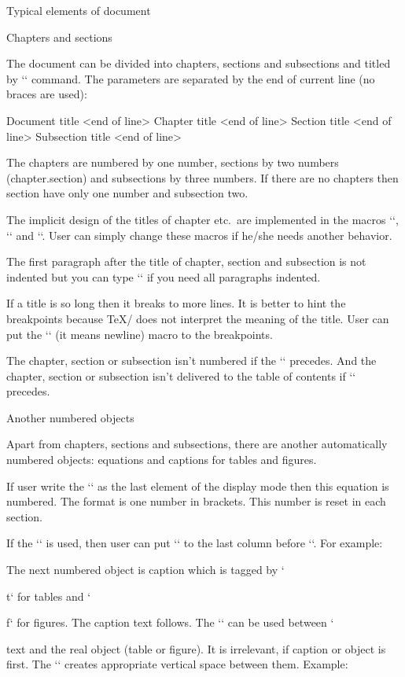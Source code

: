 \sec Typical elements of document

\secc[chap] Chapters and sections

The document can be divided into chapters, sections and subsections and titled
by `\tit` command. The parameters are separated by the end of current line (no
braces are used):

\begtt
\tit Document title <end of line>
\chap Chapter title <end of line>
\sec Section title <end of line>
\secc Subsection title <end of line>
\endtt

The chapters are numbered by one number, sections by two numbers
(chapter.section) and subsections by three numbers. If there are no chapters
then section have only one number and subsection two.

The implicit design of the titles of chapter etc.\ are implemented in the
macros `\printchap`, `\printsec` and `\printsecc`. User can simply change
these macros if he/she needs another behavior.

The first paragraph after the title of chapter, section and subsection is
not indented but you can type `\let\firstnoindent=\relax` if you need all
paragraphs indented.

If a title is so long then it breaks to more lines. It is better to hint the
breakpoints because \TeX/ does not interpret the meaning of the title.
User can put the `\nl` (it means newline) macro to the breakpoints.

The chapter, section or subsection isn't numbered if the `\nonum` precedes.
And the chapter, section or subsection isn't delivered to the table of
contents if `\notoc` precedes.

\secc[cap] Another numbered objects

Apart from chapters, sections and subsections, there are another
automatically numbered objects: equations and captions for tables and
figures.

If user write the `\eqmark` as the last element of the display mode then
this equation is numbered. The format is one number in brackets. This number
is reset in each section. 

If the `\eqalignno` is used, then user can put `\eqmark` to the last column
before `\cr`. For example:

\begtt
{}
\endtt

The next numbered object is caption which is tagged by `\caption/t` for
tables and `\caption/f` for figures. 
The caption text follows.
The `\cskip` can be used between `\caption` text and the real object (table
or figure). It is irrelevant, if caption or object is first.
The `\cskip` creates appropriate vertical space between them. Example:

